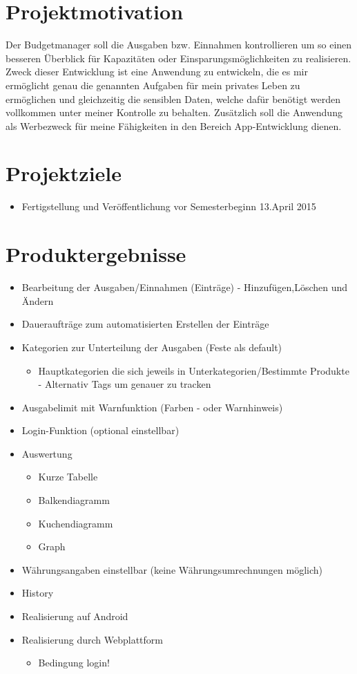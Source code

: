 \section{Projektmotivation}
Der Budgetmanager soll die Ausgaben bzw. Einnahmen kontrollieren um so einen besseren Überblick für Kapazitäten oder Einsparungsmöglichkeiten zu realisieren. Zweck dieser Entwicklung ist eine Anwendung zu entwickeln, die es mir ermöglicht genau die genannten Aufgaben für mein privates Leben zu ermöglichen und gleichzeitig die sensiblen Daten, welche dafür benötigt werden vollkommen unter meiner Kontrolle zu behalten. Zusätzlich soll die Anwendung als Werbezweck für meine Fähigkeiten in den Bereich App-Entwicklung dienen.

\section{Projektziele}
\begin{itemize}
	\item Fertigstellung und Veröffentlichung vor Semesterbeginn  13.April 2015
\end{itemize}

\section{Produktergebnisse}
\begin{itemize}
	\item Bearbeitung der Ausgaben/Einnahmen (Einträge) - Hinzufügen,Löschen und Ändern
	\item Daueraufträge zum automatisierten Erstellen der Einträge
	\item Kategorien zur Unterteilung der Ausgaben (Feste als default)
		\begin{itemize}
		\item Hauptkategorien die sich jeweils in Unterkategorien/Bestimmte Produkte - Alternativ Tags um genauer zu 	tracken
		\end{itemize}
	\item Ausgabelimit mit Warnfunktion (Farben - oder Warnhinweis)
	\item Login-Funktion (optional einstellbar)
	\item Auswertung
		\begin{itemize}
		\item Kurze Tabelle
		\item Balkendiagramm
		\item Kuchendiagramm
		\item Graph
		\end{itemize}
	\item Währungsangaben einstellbar (keine Währungsumrechnungen möglich)
	\item History 
	\item Realisierung auf Android
	\item Realisierung durch Webplattform
		\begin{itemize}
		\item Bedingung login!
		\end{itemize}
\end{itemize} 
